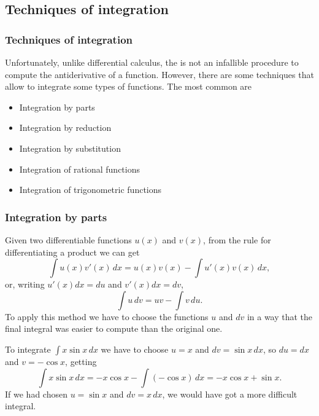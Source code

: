 \subsection{Techniques of integration}
\begin{frame}
\frametitle{Techniques of integration}
Unfortunately, unlike differential calculus, the is not an infallible procedure to compute the antiderivative of a function.
However, there are some techniques that allow to integrate some types of functions. 
The most common are
\begin{itemize}
\item Integration by parts
\item Integration by reduction
\item Integration by substitution
\item Integration of rational functions
\item Integration of trigonometric functions
\end{itemize}
\end{frame}


\begin{frame}
\frametitle{Integration by parts}
Given two differentiable functions $u(x)$ and $v(x)$, from the rule for differentiating a product we can get
\[
\int{u(x)v'(x)}\,dx=u(x)v(x)-\int{u'(x)v(x)}\,dx,
\]
or, writing $u'(x)dx=du$ and $v'(x)dx=dv$,
\[
\int{u}\,dv=uv-\int{v}\,du.
\]
To apply this method we have to choose the functions $u$ and $dv$ in a way that the final integral was easier to compute than the original one. 

 To integrate $\int{x \sin x}\,dx$ we have to choose $u=x$ and $dv=\sin x\, dx$, so $du=dx$ and $v=-\cos x$, getting
\[
\int{x \sin x}\,dx=-x\cos x-\int (-\cos x)\,dx = -x\cos x +\sin x.
\]
If we had chosen $u=\sin x$ and $dv=x\,dx$, we would have got a more difficult integral. 
\end{frame}



